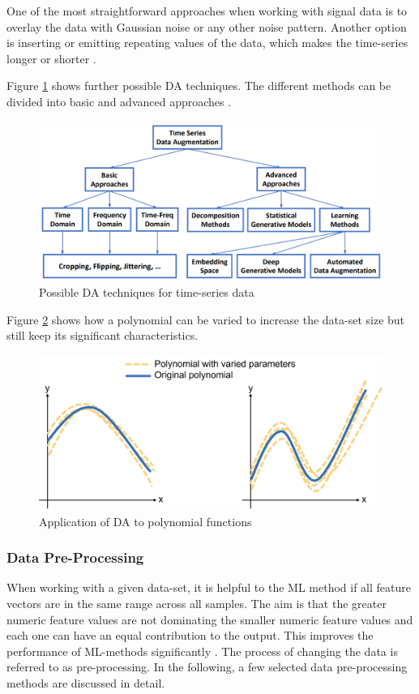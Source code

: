 One of the most straightforward approaches when working with signal data is to overlay the data with Gaussian noise or any other noise pattern. Another option is inserting or emitting repeating values of the data, which makes the time-series longer or shorter \cite{Wen}.

Figure \ref{fig:DA} shows further possible DA techniques. The different methods can be divided into basic and advanced approaches \cite{Wen}.

\begin{figure}[H]
	\centering
	\includegraphics[width=0.9\linewidth]{IMGs/DA.png}
	\caption{Possible DA techniques for time-series data \cite{Wen}}
	\label{fig:DA}
\end{figure}

Figure \ref{fig:DA2} shows how a polynomial can be varied to increase the data-set size but still keep its significant characteristics.

\begin{figure}[H]
	\centering
	\includegraphics[width=0.8\linewidth]{IMGs/DA2.png}
	\caption{Application of DA to polynomial functions}
	\label{fig:DA2}
\end{figure}

\subsubsection*{Data Pre-Processing}
When working with a given data-set, it is helpful to the ML method if all feature vectors are in the same range across all samples.
The aim is that the greater numeric feature values are not dominating the smaller numeric feature values and each one can have an equal contribution to the output. This improves the performance of ML-methods significantly \cite{Singh}. The process of changing the data is referred to as pre-processing. In the following, a few selected data pre-processing methods are discussed in detail.

